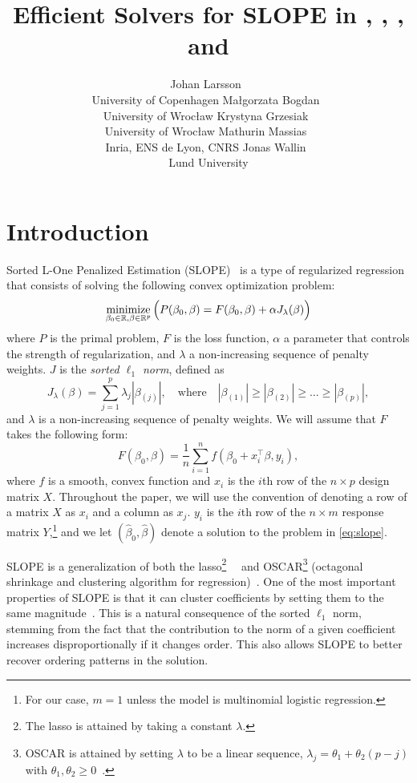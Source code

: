 \documentclass[article]{jss}
\author{
  Johan Larsson~\orcidlink{0000-0002-4029-5945}\\University of Copenhagen
  \And
  Ma\l{}gorzata Bogdan~\orcidlink{0000-0001-6355-8261}\\University of Wroc\l{}aw
  \And
  Krystyna Grzesiak~\orcidlink{0000-0003-2581-7722}\\University of Wroc\l{}aw
  \AND
  Mathurin Massias~\orcidlink{0000-0002-8950-0356}\\Inria, ENS de Lyon, CNRS
  \And
  Jonas Wallin~\orcidlink{0000-0003-0381-6593}\\Lund University
}
\title{Efficient Solvers for SLOPE in \proglang{R}, \proglang{Python}, \proglang{Julia}, and \proglang{C++}}
\begin{document}
\section{Introduction}

Sorted L-One Penalized Estimation
(SLOPE)~\citep{bogdan2013,zeng2014,bogdan2015} is a type of regularized
regression that consists of solving the following convex optimization problem:
\begin{equation}
  \label{eq:slope}
  \operatorname*{minimize}_{\beta_0 \in \mathbb{R},\beta \in \mathbb{R}^p}
  \Big(
  P(\beta_0,\beta)
  = F(\beta_0, \beta) + \alpha J_{\lambda}(\beta)
  \Big)
\end{equation}
where \(P\) is the primal problem, \(F\) is the loss function, \(\alpha\) a parameter
that controls the strength of regularization, and \(\lambda\) a non-increasing sequence of penalty weights. \(J\) is the
\emph{sorted $\ell_1$ norm}, defined as
\begin{equation}
  J_{\lambda}(\beta) = \sum_{j=1}^p \lambda_j |\beta_{(j)}|, \quad
  \text{where}\quad |\beta_{(1)}| \geq |\beta_{(2)}| \geq \ldots \geq
  |\beta_{(p)}|,
\end{equation}
and \(\lambda\) is a non-increasing sequence of penalty weights. We will
assume that \(F\) takes the following form:
\[
  F(\beta_0, \beta) = \frac{1}{n} \sum_{i=1}^n f(\beta_0 + x_i^\intercal \beta, y_i),
\]
where \(f\) is a smooth, convex function and \(x_i\) is the \(i\)th row of the
\(n \times p\) design matrix \(X\). Throughout the paper, we will use the
convention of denoting a row of a matrix \(X\) as \(x_i\) and a column as
\(x_j\). \(y_i\) is the \(i\)th row of the \(n \times m\) response matrix
\(Y\),\footnote{For our case, \(m = 1\) unless the model is multinomial
  logistic regression.}
and we let \((\hat{\beta}_0,
\hat{\beta})\) denote a solution to the problem in \autoref{eq:slope}.

SLOPE is a generalization of both the lasso\footnote{The lasso is attained by
  taking a constant
  \(\lambda\).}~~\citep{santosa1986,donoho1994,donoho1995,tibshirani1996} and
OSCAR\footnote{OSCAR is attained by setting \(\lambda\) to be a linear
  sequence, \(\lambda_j = \theta_1 + \theta_2(p - j)\) with \(\theta_1,
  \theta_2 \geq 0\)~\citep{figueiredo2014}.} (octagonal shrinkage and clustering
algorithm for regression)~\citep{bondell2008}.
One of the most important properties of SLOPE is that it can cluster coefficients by
setting them to the same magnitude~\citep{figueiredo2016,bogdan2022}. This is a natural
consequence of the sorted \(\ell_1\) norm, stemming from the fact that
the contribution to the norm of a given coefficient increases disproportionally if it
changes order. This also allows SLOPE to better recover ordering patterns
in the solution.
\end{document}
